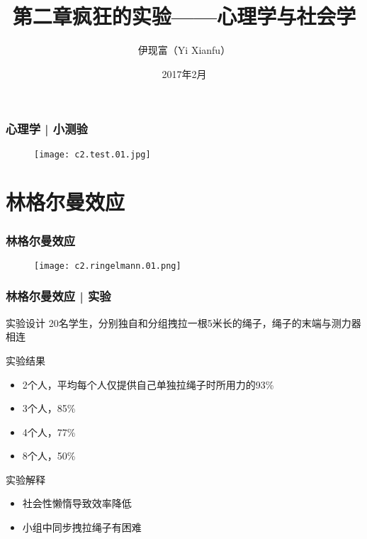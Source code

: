 



\title[心理学与社会学]{第二章\quad 疯狂的实验——心理学与社会学}
\author[Yixf]{伊现富（Yi Xianfu）}
\date{2017年2月}



\begin{frame}
  \frametitle{心理学 | 小测验}
  \begin{figure}
    \centering
    \texttt{[image: c2.test.01.jpg]}
  \end{figure}
\end{frame}

\section{林格尔曼效应}
\begin{frame}
  \frametitle{林格尔曼效应}
  \begin{figure}
    \centering
    \texttt{[image: c2.ringelmann.01.png]}
  \end{figure}
\end{frame}

\begin{frame}
  \frametitle{林格尔曼效应 | 实验}
  \begin{block}{实验设计}
      20名学生，分别独自和分组拽拉一根5米长的绳子，绳子的末端与测力器相连
  \end{block}
  \pause
  \begin{block}{实验结果}
    \begin{itemize}
      \item 2个人，平均每个人仅提供自己单独拉绳子时所用力的93\%
      \item 3个人，85\%
      \item 4个人，77\%
      \item 8个人，50\%
    \end{itemize}
  \end{block}
  \pause
  \begin{block}{实验解释}
    \begin{itemize}
      \item 社会性懒惰导致效率降低
      \item 小组中同步拽拉绳子有困难
    \end{itemize}
  \end{block}
\end{frame}

